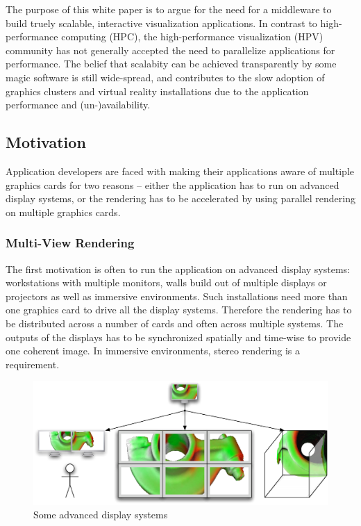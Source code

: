 \documentclass[10pt,a4paper]{scrartcl}
\begin{document}
The purpose of this white paper is to argue for the need for a middleware to
build truely scalable, interactive visualization applications. In
contrast to high-performance computing (HPC), the high-performance
visualization (HPV) community has not generally accepted the need to
parallelize applications for performance. The belief that scalabity can be
achieved transparently by some magic software is still wide-spread, and
contributes to the slow adoption of graphics clusters and virtual reality
installations due to the application performance and (un-)availability.


\subsection{Motivation}
Application developers are faced with making their applications
aware of multiple graphics cards for two reasons -- either the
application has to run on advanced display systems, or the rendering has
to be accelerated by using parallel rendering on multiple graphics cards.

\subsubsection{Multi-View Rendering}
The first motivation is often to run the application on advanced display
systems: workstations with multiple monitors, walls build out of
multiple displays or projectors as well as immersive environments. Such
installations need more than one graphics card to drive all the display
systems. Therefore the rendering has to be distributed across a
number of cards and often across multiple systems. The outputs of the
displays has to be synchronized spatially and time-wise to provide one
coherent image. In immersive environments, stereo rendering is a requirement.

\begin{figure}[ht]
\centering
\includegraphics[width=0.9\columnwidth]{images/sp_to_mp.pdf}
\caption{Some advanced display systems}
\label{FIG_multipipe}
\end{figure}
\end{document}
